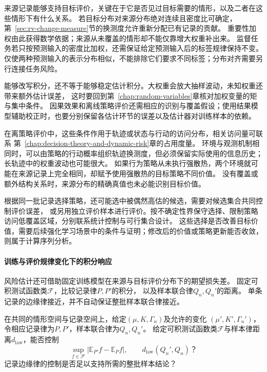 来源记录能够支持目标评价，关键在于它是否见过目标需要的情形，以及二者在这些情形下有什么关系。
若目标分布对来源分布绝对连续且密度比可确定，第~\ref{sec:rv-change-measure}节的换测度允许重新分配已有记录的贡献。
重要性加权由此获得数学依据；来源从未覆盖的情形却不能仅靠增大权重补出来。
监督任务若只按预测输入的密度比加权，还需保证给定预测输入后的标签规律保持不变。
仅使两种预测输入的表示分布相似，不能排除它们要求不同标签；分布对齐需要另行连接任务风险。

能够改写积分，还不等于能够稳定估计积分。大权重会放大抽样波动，未知权重还带来额外估计误差，
这时要回到第~\ref{chap:random-variables}章核对加权变量的矩与集中条件。
因果效果和离线策略评价还需相应的识别与覆盖假设；使用结果模型辅助校正时，也要分别保留各估计环节的误差以及估计器对训练样本的依赖。

在离策略评价中，这些条件作用于轨迹或状态与行动的访问分布，相关访问量可联系
第~\ref{chap:decision-theory-and-dynamic-risk}章的占用度量。
环境与观测机制相同时，可以由策略的行动概率组织轨迹换测度，但必须保留实际使用的信息历史；
长轨迹中的权重波动也可能很大。
如果行为策略从未执行强散热，两个环境就可能在来源记录上完全相同，却赋予使用强散热的目标策略不同价值。
没有覆盖或额外结构关系时，来源分布的精确真值也未必能识别目标价值。

根据同一批记录选择策略，还可能选中被偶然高估的候选，需要对候选集合共同控制评价误差，
或另用独立评价样本进行评价。按不确定性界保守选择、限制策略访问低覆盖区域，分别联系统计控制与可行集合设计。
这些选择是否改善目标价值，需要后续强化学习场景中的条件与证明；修改后的价值或策略更新能否收敛，则属于计算序列分析。

\paragraph{训练与评价规律变化下的积分响应}
\label{sec:future-analysis-data-law-perturbation}

风险估计还可借助固定训练模型在来源与目标评价分布下的期望损失差。
固定可积测试函数类$\mathcal F$，比较记录律$P,P'$的积分，
以及样本联合律$Q_n,Q_n'$的距离。
单条记录的边缘律接近，并不自动保证整批样本联合律接近。

\begin{mathproblem}[观测规律与风险积分的扰动]
  \label{question:future-data-law-perturbation}
  在共同的情形空间与记录空间上，给定$(\mu,K,\Gamma_n)$及允许的变化
  $(\mu',K',\Gamma_n')$，令相应记录律为$P,P'$，样本联合律为$Q_n,Q_n'$。
  给定可积测试函数类$\mathcal F$与样本律距离$d_{\mathrm{law}}$，能否控制
  \[
    \sup_{f\in\mathcal F}|\mathbb E_{P'}f-\mathbb E_Pf|,
    \qquad d_{\mathrm{law}}(Q_n',Q_n)\text{？}
  \]
  记录边缘律的控制是否足以支持所需的整批样本结论？
\end{mathproblem}

